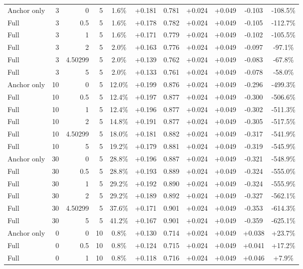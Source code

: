 \begin{table}[htbp]
\begin{tabular}{lrrrccccccc}
Anchor only & 3 & 0 & 5 & 1.6\% & +0.181 & 0.781 & +0.024 & +0.049 & -0.103 & -108.5\% \\
Full & 3 & 0.5 & 5 & 1.6\% & +0.178 & 0.782 & +0.024 & +0.049 & -0.105 & -112.7\% \\
Full & 3 & 1 & 5 & 1.6\% & +0.171 & 0.779 & +0.024 & +0.049 & -0.102 & -105.5\% \\
Full & 3 & 2 & 5 & 2.0\% & +0.163 & 0.776 & +0.024 & +0.049 & -0.097 & -97.1\% \\
Full & 3 & 4.50299 & 5 & 2.0\% & +0.139 & 0.762 & +0.024 & +0.049 & -0.083 & -67.8\% \\
Full & 3 & 5 & 5 & 2.0\% & +0.133 & 0.761 & +0.024 & +0.049 & -0.078 & -58.0\% \\
Anchor only & 10 & 0 & 5 & 12.0\% & +0.199 & 0.876 & +0.024 & +0.049 & -0.296 & -499.3\% \\
Full & 10 & 0.5 & 5 & 12.4\% & +0.197 & 0.877 & +0.024 & +0.049 & -0.300 & -506.6\% \\
Full & 10 & 1 & 5 & 12.4\% & +0.196 & 0.877 & +0.024 & +0.049 & -0.302 & -511.3\% \\
Full & 10 & 2 & 5 & 14.8\% & +0.191 & 0.877 & +0.024 & +0.049 & -0.305 & -517.5\% \\
Full & 10 & 4.50299 & 5 & 18.0\% & +0.181 & 0.882 & +0.024 & +0.049 & -0.317 & -541.9\% \\
Full & 10 & 5 & 5 & 19.2\% & +0.179 & 0.881 & +0.024 & +0.049 & -0.319 & -545.9\% \\
Anchor only & 30 & 0 & 5 & 28.8\% & +0.196 & 0.887 & +0.024 & +0.049 & -0.321 & -548.9\% \\
Full & 30 & 0.5 & 5 & 28.8\% & +0.193 & 0.889 & +0.024 & +0.049 & -0.324 & -555.0\% \\
Full & 30 & 1 & 5 & 29.2\% & +0.192 & 0.890 & +0.024 & +0.049 & -0.324 & -555.9\% \\
Full & 30 & 2 & 5 & 29.2\% & +0.189 & 0.892 & +0.024 & +0.049 & -0.327 & -562.1\% \\
Full & 30 & 4.50299 & 5 & 37.6\% & +0.171 & 0.901 & +0.024 & +0.049 & -0.353 & -614.3\% \\
Full & 30 & 5 & 5 & 41.2\% & +0.167 & 0.901 & +0.024 & +0.049 & -0.359 & -625.1\% \\
Anchor only & 0 & 0 & 10 & 0.8\% & +0.130 & 0.714 & +0.024 & +0.049 & +0.038 & +23.7\% \\
Full & 0 & 0.5 & 10 & 0.8\% & +0.124 & 0.715 & +0.024 & +0.049 & +0.041 & +17.2\% \\
Full & 0 & 1 & 10 & 0.8\% & +0.118 & 0.716 & +0.024 & +0.049 & +0.046 & +7.9\% \\

\end{tabular}
\end{table}
